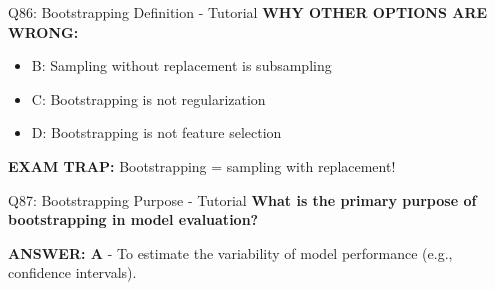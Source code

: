 \documentclass[8pt]{beamer}
\begin{document}
\begin{frame}{Q86: Bootstrapping Definition - Tutorial}
		\vspace{0.05cm}
		\textcolor{myred}{\textbf{WHY OTHER OPTIONS ARE WRONG:}}
		\begin{itemize}
			\item \textcolor{myred}{B:} Sampling without replacement is subsampling
			\item \textcolor{myred}{C:} Bootstrapping is not regularization
			\item \textcolor{myred}{D:} Bootstrapping is not feature selection
		\end{itemize}
		
		\textcolor{myred}{\textbf{EXAM TRAP:}} Bootstrapping = sampling with replacement!
	\end{frame}
	
	\begin{frame}{Q87: Bootstrapping Purpose - Tutorial}
		\fontsize{6.5}{7.5}\selectfont
		\textbf{What is the primary purpose of bootstrapping in model evaluation?}
		
		\vspace{0.05cm}
		\textcolor{myblue}{\textbf{ANSWER: A}} - To estimate the variability of model performance (e.g., confidence intervals).
		

\end{frame}
\end{document}
